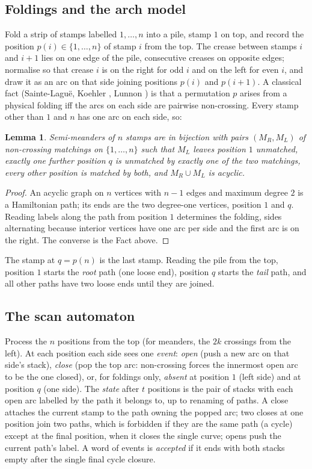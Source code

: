 \documentclass[11pt]{amsart}
\newtheorem{lemma}[theorem]{Lemma}
\theoremstyle{definition}
\begin{document}
\subsection{Foldings and the arch model}\label{sub:arch}
Fold a strip of stamps labelled $1,\dots,n$ into a pile, stamp $1$ on top, and record the position $p(i)\in\{1,\dots,n\}$ of stamp $i$ from the top. The crease between stamps $i$ and $i+1$ lies on one edge of the pile, consecutive creases on opposite edges; normalise so that crease $i$ is on the right for odd $i$ and on the left for even $i$, and draw it as an arc on that side joining positions $p(i)$ and $p(i+1)$. A classical fact (Sainte-Lagu\"e, Koehler \cite{Koehler}, Lunnon \cite{Lunnon}) is that a permutation $p$ arises from a physical folding iff the arcs on each side are pairwise non-crossing. Every stamp other than $1$ and $n$ has one arc on each side, so:

\begin{lemma}\label{lem:arch}
Semi-meanders of $n$ stamps are in bijection with pairs $(M_R,M_L)$ of non-crossing matchings on $\{1,\dots,n\}$ such that $M_L$ leaves position $1$ unmatched, exactly one further position $q$ is unmatched by exactly one of the two matchings, every other position is matched by both, and $M_R\cup M_L$ is acyclic.
\end{lemma}

\begin{proof}
An acyclic graph on $n$ vertices with $n-1$ edges and maximum degree $2$ is a Hamiltonian path; its ends are the two degree-one vertices, position $1$ and $q$. Reading labels along the path from position $1$ determines the folding, sides alternating because interior vertices have one arc per side and the first arc is on the right. The converse is the Fact above.
\end{proof}

The stamp at $q=p(n)$ is the last stamp. Reading the pile from the top, position $1$ starts the \emph{root} path (one loose end), position $q$ starts the \emph{tail} path, and all other paths have two loose ends until they are joined.

\subsection{The scan automaton}\label{sub:scan}
Process the $n$ positions from the top (for meanders, the $2k$ crossings from the left). At each position each side sees one \emph{event}: \emph{open} (push a new arc on that side's stack), \emph{close} (pop the top arc: non-crossing forces the innermost open arc to be the one closed), or, for foldings only, \emph{absent} at position $1$ (left side) and at position $q$ (one side). The \emph{state} after $t$ positions is the pair of stacks with each open arc labelled by the path it belongs to, up to renaming of paths. A close attaches the current stamp to the path owning the popped arc; two closes at one position join two paths, which is forbidden if they are the same path (a cycle) except at the final position, when it closes the single curve; opens push the current path's label. A word of events is \emph{accepted} if it ends with both stacks empty after the single final cycle closure.
\end{document}
